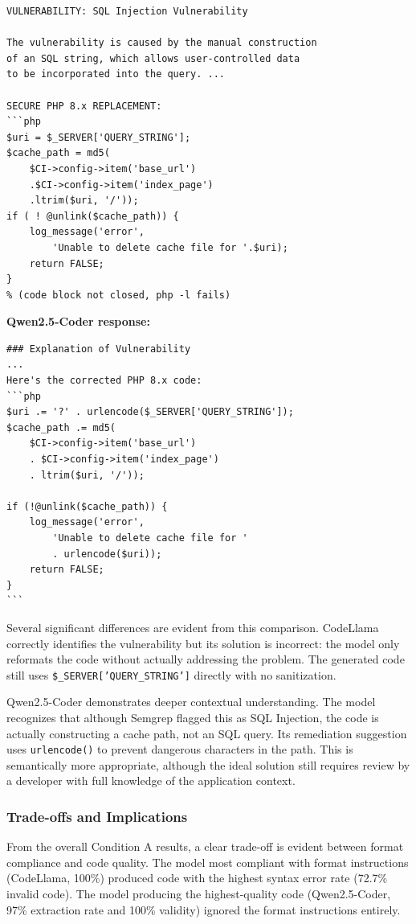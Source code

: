 \begin{lstlisting}[style=promptstyle]
VULNERABILITY: SQL Injection Vulnerability

The vulnerability is caused by the manual construction
of an SQL string, which allows user-controlled data
to be incorporated into the query. ...

SECURE PHP 8.x REPLACEMENT:
```php
$uri = $_SERVER['QUERY_STRING'];
$cache_path = md5(
    $CI->config->item('base_url')
    .$CI->config->item('index_page')
    .ltrim($uri, '/'));
if ( ! @unlink($cache_path)) {
    log_message('error',
        'Unable to delete cache file for '.$uri);
    return FALSE;
}
% (code block not closed, php -l fails)
\end{lstlisting}
\newpage
\textbf{Qwen2.5-Coder response:}
\begin{lstlisting}[style=promptstyle]
### Explanation of Vulnerability
...
Here's the corrected PHP 8.x code:
```php
$uri .= '?' . urlencode($_SERVER['QUERY_STRING']);
$cache_path .= md5(
    $CI->config->item('base_url')
    . $CI->config->item('index_page')
    . ltrim($uri, '/'));

if (!@unlink($cache_path)) {
    log_message('error',
        'Unable to delete cache file for '
        . urlencode($uri));
    return FALSE;
}
```
\end{lstlisting}

Several significant differences are evident from this comparison. CodeLlama correctly identifies the vulnerability but its solution is incorrect: the model only reformats the code without actually addressing the problem. The generated code still uses \texttt{\$\_SERVER['QUERY\_STRING']} directly with no sanitization.

Qwen2.5-Coder demonstrates deeper contextual understanding. The model recognizes that although Semgrep flagged this as SQL Injection, the code is actually constructing a cache path, not an SQL query. Its remediation suggestion uses \texttt{urlencode()} to prevent dangerous characters in the path. This is semantically more appropriate, although the ideal solution still requires review by a developer with full knowledge of the application context.

\subsubsection{Trade-offs and Implications}

From the overall Condition A results, a clear trade-off is evident between format compliance and code quality. The model most compliant with format instructions (CodeLlama, 100\%) produced code with the highest syntax error rate (72.7\% invalid code). The model producing the highest-quality code (Qwen2.5-Coder, 97\% extraction rate and 100\% validity) ignored the format instructions entirely.

